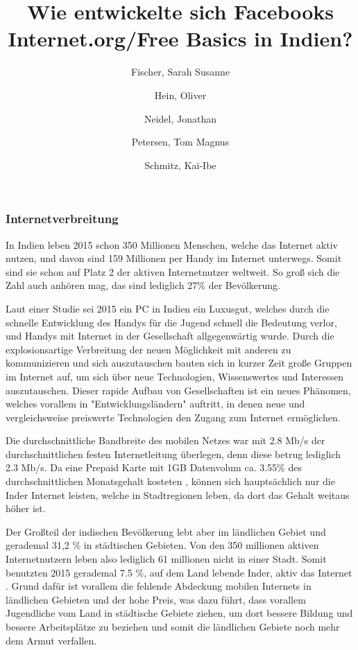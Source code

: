 \documentclass{article}
\title{Wie entwickelte sich Facebooks Internet.org/Free Basics in Indien?}
\author{
  Fischer, Sarah Susanne\\
  \and
  Hein, Oliver\\
  \and
  Neidel, Jonathan\\
  \and
  Petersen, Tom Magnus\\
  \and
  Schmitz, Kai-Ibe\\
}
\begin{document}
\maketitle
\subsubsection{Internetverbreitung}

In Indien leben 2015 schon 350 Millionen Menschen\autocite{slideshareIndia}, welche das Internet aktiv nutzen, und davon sind 159 Millionen per Handy im Internet unterwegs. Somit sind sie schon auf Platz 2 der aktiven Internetnutzer weltweit. So groß sich die Zahl auch anhören mag, das sind lediglich 27\% der Bevölkerung\autocite{InternetCountry}. 

Laut einer Studie sei 2015 ein PC in Indien ein Luxusgut, welches durch die schnelle Entwicklung des Handys für die Jugend schnell die Bedeutung verlor, und Handys mit Internet in der Gesellschaft allgegenwärtig wurde. Durch die explosionsartige Verbreitung der neuen Möglichkeit mit anderen zu kommunizieren und sich auszutauschen bauten sich in kurzer Zeit große Gruppen im Internet auf, um sich über neue Technologien, Wissenswertes und Interessen auszutauschen. Dieser rapide Aufbau von Gesellschaften ist ein neues Phänomen, welches vorallem in "Entwicklungsländern" auftritt, in denen neue und vergleichsweise preiswerte Technologien den Zugang zum Internet ermöglichen.   \textcite{empowermentThroughFacebook}

\medskip
Die durchschnittliche Bandbreite des mobilen Netzes war mit 2.8 Mb/s der durchschnittlichen festen Internetleitung überlegen, denn diese betrug lediglich 2.3 Mb/s\autocite{slideshareIndia}.
Da eine Prepaid Karte mit 1GB Datenvolum ca. 3.55\% des durchschnittlichen Monatsgehalt kosteten \autocite{broadbandAgency}, können sich hauptsächlich nur die Inder Internet leisten, welche in Stadtregionen leben, da dort das Gehalt weitaus höher ist.

 Der Großteil der indischen Bevölkerung lebt aber im ländlichen Gebiet  und gerademal 31,2 \% \autocite{IndiaBevölkerung} in städtischen Gebieten. 
Von den 350 millionen aktiven Internetnutzern leben also lediglich 61 millionen nicht in einer Stadt. Somit benutzten 2015 gerademal 7.5 \%, auf dem Land lebende Inder, aktiv das Internet \autocite{slideshareIndia}.
Grund dafür ist vorallem die fehlende Abdeckung mobilen Internets in ländlichen Gebieten und der hohe Preis, was dazu führt, dass vorallem Jugendliche vom Land in städtische Gebiete ziehen, um dort bessere Bildung und bessere Arbeitsplätze zu beziehen und somit die ländlichen Gebiete noch mehr dem Armut verfallen. 


\end{document}

